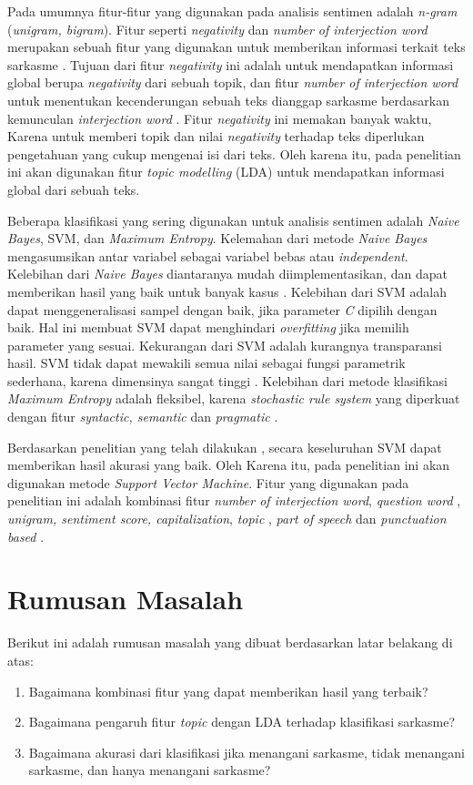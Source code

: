 Pada umumnya fitur-fitur yang digunakan pada analisis sentimen adalah \textit{n-gram} (\textit{unigram, bigram}). Fitur seperti \textit{negativity} dan \textit{number of interjection word} merupakan sebuah fitur yang digunakan untuk memberikan informasi terkait teks sarkasme \cite{5}. Tujuan dari fitur \textit{negativity} ini adalah untuk mendapatkan informasi global berupa \textit{negativity} dari sebuah topik, dan fitur \textit{number of interjection word} untuk menentukan kecenderungan sebuah teks dianggap sarkasme berdasarkan kemunculan \textit{interjection word }\cite{5}. Fitur \textit{negativity} ini 
memakan banyak waktu, Karena untuk memberi topik dan nilai \textit{negativity} terhadap teks diperlukan pengetahuan yang cukup mengenai isi dari teks. Oleh karena itu, pada penelitian ini akan digunakan fitur \textit{topic modelling }(LDA) untuk mendapatkan informasi global dari sebuah teks. 

Beberapa klasifikasi yang sering digunakan untuk analisis sentimen adalah \textit{Naive Bayes}, SVM, dan \textit{Maximum Entropy}. Kelemahan dari metode \textit{Naive Bayes} mengasumsikan antar variabel sebagai variabel bebas atau \textit{independent}. Kelebihan dari \textit{Naive Bayes} diantaranya mudah diimplementasikan, dan dapat memberikan hasil yang baik untuk banyak kasus \cite{5}. Kelebihan dari SVM adalah dapat menggeneralisasi sampel dengan baik, jika parameter \textit{C} dipilih dengan baik. Hal ini membuat SVM dapat menghindari \textit{overfitting} jika memilih parameter yang sesuai. Kekurangan dari SVM adalah kurangnya transparansi hasil. SVM tidak dapat mewakili semua nilai sebagai fungsi parametrik sederhana, karena dimensinya sangat tinggi \cite{7}. Kelebihan dari metode klasifikasi \textit{Maximum Entropy} adalah fleksibel, karena \textit{stochastic rule system} yang diperkuat dengan fitur \textit{syntactic, semantic} dan \textit{pragmatic} \cite{8}\textit{.}

Berdasarkan penelitian yang telah dilakukan \cite{3}\cite{4}\cite{5}, secara keseluruhan SVM dapat memberikan hasil akurasi yang baik. Oleh Karena itu, pada penelitian ini akan digunakan metode \textit{Support Vector Machine}. Fitur yang digunakan pada penelitian ini adalah kombinasi fitur \textit{number of interjection word}, \textit{question word }\cite{5}, \textit{unigram, sentiment score,  capitalization}, \textit{topic} \cite{4}, \textit{part of speech} dan \textit{punctuation based} \cite{3}. 

\section{Rumusan Masalah}
Berikut ini adalah rumusan masalah yang dibuat berdasarkan latar belakang di atas:
\begin {enumerate}[nolistsep, leftmargin=0.5cm]
\item Bagaimana kombinasi fitur yang dapat memberikan hasil yang 
terbaik?
\item Bagaimana pengaruh fitur \textit{topic} dengan LDA terhadap 
klasifikasi sarkasme?
\item Bagaimana akurasi dari klasifikasi jika menangani sarkasme, tidak menangani sarkasme, dan hanya menangani sarkasme?
\end{enumerate}

